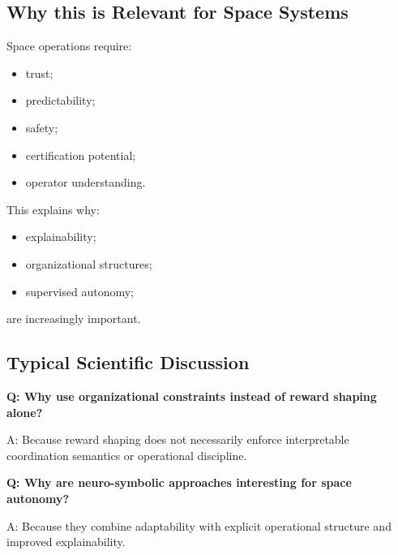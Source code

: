 \documentclass[10pt,a4paper,twocolumn]{article}
\begin{document}

\subsection{Why this is Relevant for Space Systems}

Space operations require:
\begin{itemize}
    \item trust;
    \item predictability;
    \item safety;
    \item certification potential;
    \item operator understanding.
\end{itemize}

This explains why:
\begin{itemize}
    \item explainability;
    \item organizational structures;
    \item supervised autonomy;
\end{itemize}

are increasingly important.


\subsection{Typical Scientific Discussion}

\begin{questionbox}
    \textbf{Q: Why use organizational constraints instead of reward shaping alone?}

    A: Because reward shaping does not necessarily enforce interpretable coordination semantics or operational discipline.
\end{questionbox}

\begin{questionbox}
    \textbf{Q: Why are neuro-symbolic approaches interesting for space autonomy?}

    A: Because they combine adaptability with explicit operational structure and improved explainability.
\end{questionbox}
\end{document}
